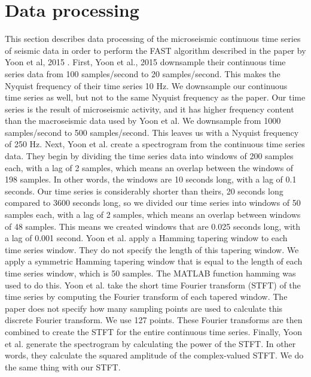 \section{Data processing}
This section describes data processing of the microseismic continuous time series of seismic data in order to perform the FAST algorithm described in the paper by Yoon et al, 2015 \cite{yoon2015earthquake}. 
\newline
First, Yoon et al., 2015 downsample their continuous time series data from 100 samples/second to 20 samples/second. This makes the Nyquist frequency of their time series 10 Hz. We downsample our continuous time series as well, but not to the same Nyquist frequency as the paper. Our time series is the result of microseismic activity, and it has higher frequency content than the macroseismic data used by Yoon et al. We downsample from 1000 samples/second to 500 samples/second. This leaves us with a Nyquist frequency of 250 Hz. 
\newline
Next, Yoon et al. create a spectrogram from the continuous time series data. They begin by dividing the time series data into windows of 200 samples each, with a lag of 2 samples, which means an overlap between the windows of 198 samples. In other words, the windows are 10 seconds long, with a lag of 0.1 seconds. Our time series is considerably shorter than theirs, 20 seconds long compared to 3600 seconds long, so we divided our time series into windows of 50 samples each, with a lag of 2 samples, which means an overlap between windows of 48 samples. This means we created windows that are 0.025 seconds long, with a lag of 0.001 second. 
\newline
Yoon et al. apply a Hamming tapering window to each time series window. They do not specify the length of this tapering window. We apply a symmetric Hamming tapering window that is equal to the length of each time series window, which is 50 samples. The MATLAB function hamming was used to do this.
\newline
Yoon et al. take the short time Fourier transform (STFT) of the time series by computing the Fourier transform of each tapered window. The paper does not specify how many sampling points are used to calculate this discrete Fourier transform. We use 127 points. These Fourier transforms are then combined to create the STFT for the entire continuous time series.
\newline
Finally, Yoon et al. generate the spectrogram by calculating the power of the STFT. In other words, they calculate the squared amplitude of the complex-valued STFT. We do the same thing with our STFT.
